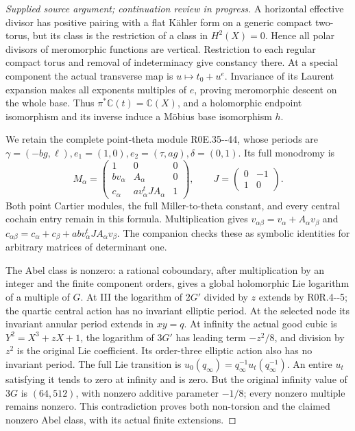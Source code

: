 \begin{proof}[Supplied source argument; continuation review in progress]
A horizontal effective divisor has positive pairing with a flat
Kähler form on a generic compact two-torus, but its class is the
restriction of a class in \(H^2(X)=0\). Hence all polar divisors of
meromorphic functions are vertical. Restriction to each regular
compact torus and removal of indeterminacy give constancy there.
At a special component the actual transverse map is
\(u\mapsto t_0+u^e\). Invariance of its Laurent expansion makes all
exponents multiples of \(e\), proving meromorphic descent on the
whole base. Thus \(\pi^*\mathbb C(t)=\mathbb C(X)\), and a
holomorphic endpoint isomorphism and its inverse induce a Möbius
base isomorphism \(h\).

We retain the complete point-theta module R0E.35-\/-44, whose periods
are \(\gamma=(-bg,\ell),e_1=(1,0),e_2=(\tau,ag),\delta=(0,1)\).
Its full monodromy is
\[
 M_\alpha=\begin{pmatrix}1&0&0\\bv_\alpha&A_\alpha&0\\
 c_\alpha&av_\alpha^tJA_\alpha&1\end{pmatrix},
 \qquad J=\begin{pmatrix}0&-1\\1&0\end{pmatrix}.   \tag{R0R.13}
\]
Both point Cartier modules, the full Miller-to-theta constant, and
every central cochain entry remain in this formula. Multiplication
gives \(v_{\alpha\beta}=v_\alpha+A_\alpha v_\beta\) and
\(c_{\alpha\beta}=c_\alpha+c_\beta+
abv_\alpha^tJA_\alpha v_\beta\). The companion checks these as
symbolic identities for arbitrary matrices of determinant one.

The Abel class is nonzero: a rational coboundary, after multiplication
by an integer and the finite component orders, gives a global
holomorphic Lie logarithm of a multiple of \(G\). At III the
logarithm of \(2G'\) divided by \(z\) extends by R0R.4-\/-5; the
quartic central action has no invariant elliptic period. At the
selected node its invariant annular period extends in \(xy=q\).
At infinity the actual good cubic is \(Y^2=X^3+zX+1\), the logarithm
of \(3G'\) has leading term \(-z^2/8\), and division by \(z^2\)
is the original Lie coefficient. Its order-three elliptic action
also has no invariant period. The full Lie transition is
\(u_0(q_\infty)=q_\infty^{-1}u_t(q_\infty^{-1})\). An entire
\(u_t\) satisfying it tends to zero at infinity and is zero.
But the original infinity value of \(3G\) is \((64,512)\), with
nonzero additive parameter \(-1/8\); every nonzero multiple remains
nonzero. This contradiction proves both non-torsion and the claimed
nonzero Abel class, with its actual finite extensions.


\end{proof}
